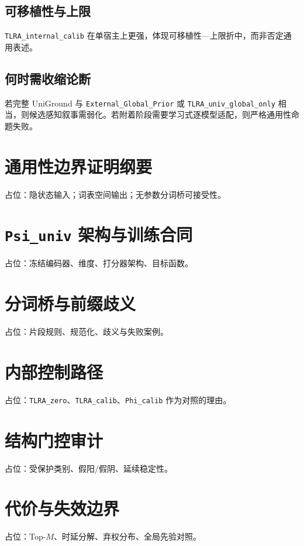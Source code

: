 \subsection{可移植性与上限}

\texttt{TLRA\_internal\_calib} 在单宿主上更强，体现可移植性—上限折中，而非否定通用表述。

\subsection{何时需收缩论断}

若完整 UniGround 与 \texttt{External\_Global\_Prior} 或 \texttt{TLRA\_univ\_global\_only} 相当，则候选感知叙事需弱化。若附着阶段需要学习式逐模型适配，则严格通用性命题失败。

\appendix

\section{通用性边界证明纲要}
占位：隐状态输入；词表空间输出；无参数分词桥可接受性。

\section{\texttt{Psi\_univ} 架构与训练合同}
占位：冻结编码器、维度、打分器架构、目标函数。

\section{分词桥与前缀歧义}
占位：片段规则、规范化、歧义与失败案例。

\section{内部控制路径}
占位：\texttt{TLRA\_zero}、\texttt{TLRA\_calib}、\texttt{Phi\_calib} 作为对照的理由。

\section{结构门控审计}
占位：受保护类别、假阳/假阴、延续稳定性。

\section{代价与失效边界}
占位：Top-$M$、时延分解、弃权分布、全局先验对照。
